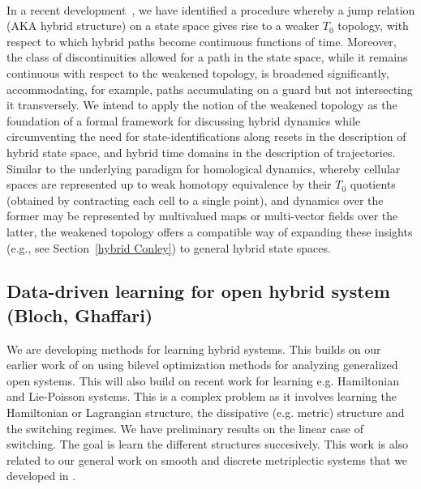 \documentclass[letterpaper,11pt]{article}
\begin{document}
\paragraph*{}
In a recent development~\cite{ClGu-weakened_topologies}, we have identified a procedure whereby a jump relation (AKA hybrid structure) on a state space gives rise to a weaker $T_0$ topology, with respect to which hybrid paths become continuous functions of time.
%
Moreover, the class of discontinuities allowed for a path in the state space, while it remains continuous with respect to the weakened topology, is broadened significantly, accommodating, for example, paths accumulating on a guard but not intersecting it transversely.
%
We intend to apply the notion of the weakened topology as the foundation of a formal framework for discussing hybrid dynamics while circumventing the need for state-identifications along resets in the description of hybrid state space, and hybrid time domains in the description of trajectories.
%
Similar to the underlying paradigm for homological dynamics, whereby cellular spaces are represented up to weak homotopy equivalence by their $T_0$ quotients (obtained by contracting each cell to a single point), and dynamics over the former may be represented by multivalued maps or multi-vector fields over the latter, the weakened topology offers a compatible way of expanding these insights (e.g., see Section~\ref{hybrid Conley}) to general hybrid state spaces. 
%

\vspace*{0.3cm}

\subsection{Data-driven learning for open hybrid system (Bloch, Ghaffari)}
We are developing methods for learning hybrid systems. This builds on our 
earlier work of \cite{teng2024generalized} on using bilevel optimization 
methods for analyzing generalized open systems. This will also build on
recent work for learning e.g. Hamiltonian and Lie-Poisson systems. This is a
complex problem as it involves learning the Hamiltonian or Lagrangian structure,
the dissipative (e.g. metric) structure and the switching regimes. We have 
preliminary results on the linear case of switching. The goal is learn the different structures succesively. This work is also related to our general work on smooth and discrete metriplectic systems that we developed in \cite{bloch2024metriplectic}.
\end{document}

